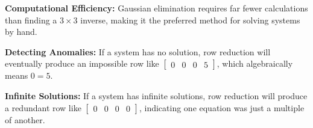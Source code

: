 \begin{takeaways}
\item \textbf{Computational Efficiency:} Gaussian elimination requires far fewer calculations than finding a $3 \times 3$ inverse, making it the preferred method for solving systems by hand.
\item \textbf{Detecting Anomalies:} If a system has no solution, row reduction will eventually produce an impossible row like $\left[ \begin{array}{ccc|c} 0 & 0 & 0 & 5 \end{array} \right]$, which algebraically means $0 = 5$. 
\item \textbf{Infinite Solutions:} If a system has infinite solutions, row reduction will produce a redundant row like $\left[ \begin{array}{ccc|c} 0 & 0 & 0 & 0 \end{array} \right]$, indicating one equation was just a multiple of another.
\end{takeaways}
